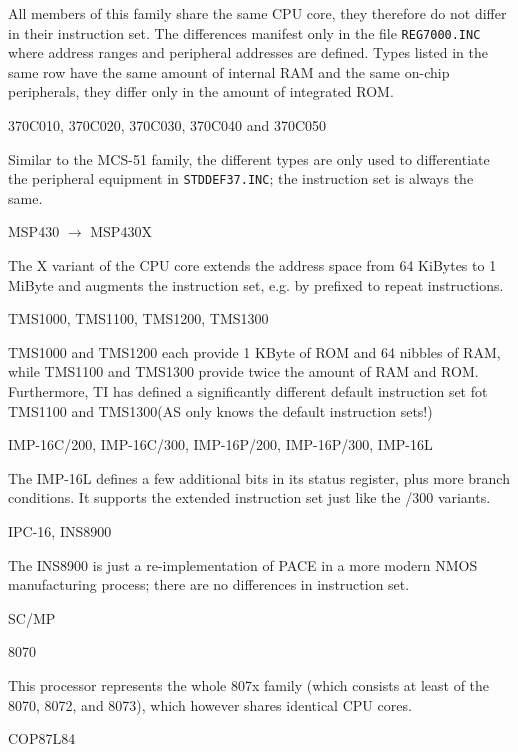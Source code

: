 \documentclass[12pt,twoside]{report}
\newcommand{\tty}[1]{{\tt #1}}
\newcommand{\asname}{{AS}}
\begin{document}
All members of this family share the same CPU core, they therefore do not
differ in their instruction set.  The differences manifest only in the
file \tty{REG7000.INC} where address ranges and peripheral addresses are
defined.  Types listed in the same row have the same amount of internal
RAM and the same on-chip peripherals, they differ only in the amount of
integrated ROM.
\begin{cpulist}
  370C010, 370C020, 370C030, 370C040 and 370C050
\end{cpulist}
Similar to the MCS-51 family, the different types are only used to
differentiate the peripheral equipment in \tty{STDDEF37.INC}; the
instruction set is always the same.
\begin{cpulist}
   MSP430 $\rightarrow$ MSP430X
\end{cpulist}
The X variant of the CPU core extends the address space from 64
KiBytes to 1 MiByte and augments the instruction set, e.g. by
prefixed to repeat instructions.
\begin{cpulist}
   TMS1000, TMS1100, TMS1200, TMS1300
\end{cpulist}
TMS1000 and TMS1200 each provide 1 KByte of ROM and 64 nibbles of
RAM, while TMS1100 and TMS1300 provide twice the amount of RAM
and ROM.  Furthermore, TI has defined a significantly different
default instruction set fot TMS1100 and TMS1300(\asname{} only knows the
default instruction sets!)
\begin{cpulist}
   IMP-16C/200, IMP-16C/300, IMP-16P/200, IMP-16P/300, IMP-16L
\end{cpulist}
The IMP-16L defines a few additional bits in its status register,
plus more branch conditions.  It supports the extended instruction
set just like the /300 variants.
\begin{cpulist}
   IPC-16, INS8900
\end{cpulist}
The INS8900 is just a re-implementation of PACE in a more modern
NMOS manufacturing process; there are no differences in instruction
set.
\begin{cpulist}
   SC/MP
\end{cpulist}
\begin{cpulist}
   8070
\end{cpulist}
This processor represents the whole 807x family (which consists at least
of the 8070, 8072, and 8073), which however shares identical CPU cores.
\begin{cpulist}
   COP87L84
\end{cpulist}
\end{document}
